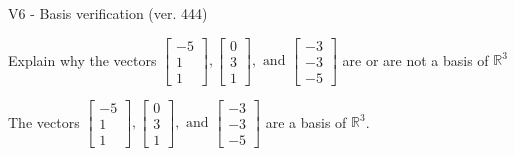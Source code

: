 \begin{exercise}
  \begin{exerciseTitle}V6 - Basis verification (ver. 444)\end{exerciseTitle}
  \begin{exerciseStatement}
    Explain why the vectors \(\left[\begin{array}{r}
-5 \\
1 \\
1
\end{array}\right] , \left[\begin{array}{r}
0 \\
3 \\
1
\end{array}\right] , \text{ and } \left[\begin{array}{r}
-3 \\
-3 \\
-5
\end{array}\right]\) are or are not a basis of \(\mathbb{R}^3\)	


  \end{exerciseStatement}
  \begin{exerciseAnswer}
   The vectors \(\left[\begin{array}{r}
-5 \\
1 \\
1
\end{array}\right] , \left[\begin{array}{r}
0 \\
3 \\
1
\end{array}\right] , \text{ and } \left[\begin{array}{r}
-3 \\
-3 \\
-5
\end{array}\right]\) 
  	 are  a basis of \(\mathbb{R}^3\).
  


  \end{exerciseAnswer}
\end{exercise}